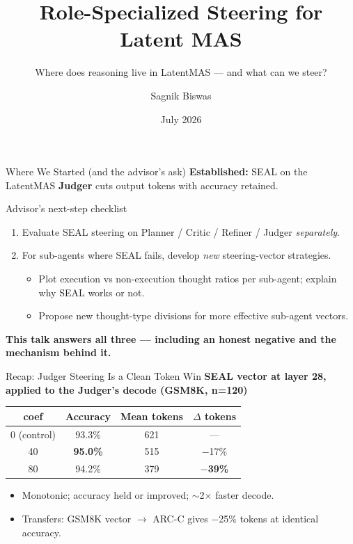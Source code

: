 \documentclass{beamer}
\title{Role-Specialized Steering for Latent MAS}
\subtitle{Where does reasoning live in LatentMAS --- and what can we steer?}
\author{Sagnik Biswas}
\date{July 2026}
\begin{document}
\begin{frame}
    \titlepage
    \vspace{-1cm}
\end{frame}

\begin{frame}{Where We Started (and the advisor's ask)}
    \textbf{Established:} SEAL on the LatentMAS \textbf{Judger} cuts output tokens with accuracy retained.
    \vspace{0.2cm}
    \begin{block}{Advisor's next-step checklist}
        \begin{enumerate}
            \item Evaluate SEAL steering on Planner / Critic / Refiner / Judger \emph{separately}.
            \item For sub-agents where SEAL fails, develop \emph{new} steering-vector strategies.
            \begin{itemize}
                \item Plot execution vs non-execution thought ratios per sub-agent; explain why SEAL works or not.
                \item Propose new thought-type divisions for more effective sub-agent vectors.
            \end{itemize}
        \end{enumerate}
    \end{block}
    \textbf{This talk answers all three --- including an honest negative and the mechanism behind it.}
\end{frame}

\begin{frame}{Recap: Judger Steering Is a Clean Token Win}
    \textbf{SEAL vector at layer 28, applied to the Judger's decode (GSM8K, n=120)}
    \begin{table}[]
        \centering\small
        \begin{tabular}{|c|c|c|c|}
            \hline
            \textbf{coef} & \textbf{Accuracy} & \textbf{Mean tokens} & \textbf{$\Delta$ tokens} \\ \hline
            0 (control) & 93.3\% & 621 & --- \\ \hline
            40 & \textbf{95.0\%} & 515 & $-$17\% \\ \hline
            80 & 94.2\% & 379 & \textbf{$-$39\%} \\ \hline
        \end{tabular}
    \end{table}
    \begin{itemize}
        \item Monotonic; accuracy held or improved; $\sim$2$\times$ faster decode.
        \item Transfers: GSM8K vector $\rightarrow$ ARC-C gives $-$25\% tokens at identical accuracy.
    \end{itemize}
\end{frame}
\end{document}
